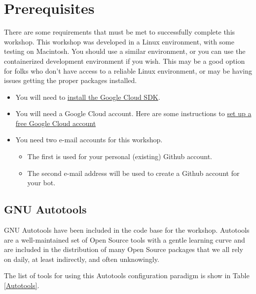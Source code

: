 \section{\label{sec:preparation}Prerequisites}

\justifying
There are some requirements that must be met to successfully complete this workshop. This workshop was developed in a Linux environment, with some testing on Macintosh. You should use a similar environment, or you can use the containerized development environment if you wish. This may be a good option for folks who don't have access to a reliable Linux environment, or may be having issues getting the proper packages installed.


\begin{raggedright}
    \begin{itemize}
        \item You will need to \href{https://cloud.google.com/sdk/docs/install}{install the Google Cloud SDK}.
        \item You will need a Google Cloud account. Here are some instructions to \href{https://cloud.google.com/free/}{set up a free Google Cloud account}
        \item You need two e-mail accounts for this workshop.
        \begin{itemize}
            \item The first is used for your personal (existing) Github account.
            \item The second e-mail address will be used to create a Github account for your bot.
	   \end{itemize}
    \end{itemize}
\end{raggedright}
\vspace{2mm}

\subsection{\label{sec:autotools}GNU Autotools}

\justifying
GNU Autotools have been included in the code base for the workshop. Autotools are a well-maintained set of Open Source tools with a gentle learning curve and are included in the distribution of many Open Source packages that we all rely on daily, at least indirectly, and often unknowingly.

\justifying
The list of tools for using this Autotools configuration paradigm is show in Table \ref{Autotools}.
\vspace{2mm}

